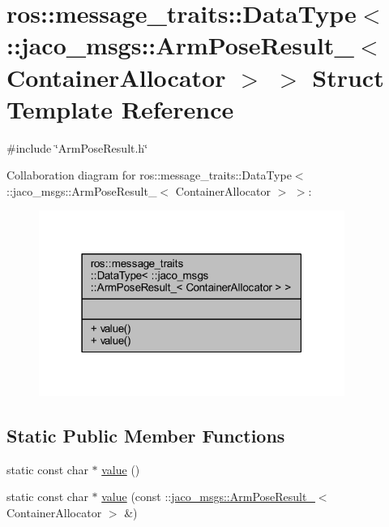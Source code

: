 \hypertarget{structros_1_1message__traits_1_1DataType_3_01_1_1jaco__msgs_1_1ArmPoseResult___3_01ContainerAllocator_01_4_01_4}{}\section{ros\+:\+:message\+\_\+traits\+:\+:Data\+Type$<$ \+:\+:jaco\+\_\+msgs\+:\+:Arm\+Pose\+Result\+\_\+$<$ Container\+Allocator $>$ $>$ Struct Template Reference}
\label{structros_1_1message__traits_1_1DataType_3_01_1_1jaco__msgs_1_1ArmPoseResult___3_01ContainerAllocator_01_4_01_4}


{\ttfamily \#include \char`\"{}Arm\+Pose\+Result.\+h\char`\"{}}



Collaboration diagram for ros\+:\+:message\+\_\+traits\+:\+:Data\+Type$<$ \+:\+:jaco\+\_\+msgs\+:\+:Arm\+Pose\+Result\+\_\+$<$ Container\+Allocator $>$ $>$\+:
\nopagebreak
\begin{figure}[H]
\begin{center}
\leavevmode
\includegraphics[width=283pt]{d3/d83/structros_1_1message__traits_1_1DataType_3_01_1_1jaco__msgs_1_1ArmPoseResult___3_01ContainerAllocator_01_4_01_4__coll__graph}
\end{center}
\end{figure}
\subsection*{Static Public Member Functions}
\begin{DoxyCompactItemize}
\item 
static const char $\ast$ \hyperlink{structros_1_1message__traits_1_1DataType_3_01_1_1jaco__msgs_1_1ArmPoseResult___3_01ContainerAllocator_01_4_01_4_a2e753a1db2bf21d14d1eed9f77d159c2}{value} ()
\item 
static const char $\ast$ \hyperlink{structros_1_1message__traits_1_1DataType_3_01_1_1jaco__msgs_1_1ArmPoseResult___3_01ContainerAllocator_01_4_01_4_afa0114ae100fc123354f3e360f471ceb}{value} (const \+::\hyperlink{structjaco__msgs_1_1ArmPoseResult__}{jaco\+\_\+msgs\+::\+Arm\+Pose\+Result\+\_\+}$<$ Container\+Allocator $>$ \&)
\end{DoxyCompactItemize}


